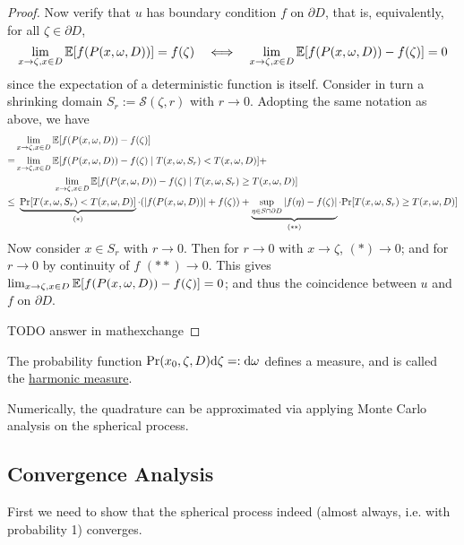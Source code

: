 \documentclass[10pt]{article}
\begin{document}
\begin{proof}
    Now verify that $u$ has boundary condition $f$ on $\partial D$, that is, equivalently, for all $\zeta \in \partial D$,
    \[
        \lim_{x \to \zeta, x \in D} \mathbb{E}[f(P(x, \omega, D))] = f(\zeta)
        \quad \Longleftrightarrow \quad
        \lim_{x \to \zeta, x \in D} \mathbb{E}[f(P(x, \omega, D)) - f(\zeta)] = 0
    \]
    since the expectation of a deterministic function is itself. Consider in turn a shrinking domain $S_r := \mathcal{S}(\zeta, r)$ with $r \to 0$. Adopting the same notation as above, we have
    \begin{align*}
        & \lim_{x \to \zeta, x \in D} \mathbb{E}[f(P(x, \omega, D)) - f(\zeta)] \\
        = & \lim_{x \to \zeta, x \in D} \mathbb{E}[f(P(x, \omega, D)) - f(\zeta) \mid T(x, \omega, S_r) < T(x, \omega, D)] + \\
        & \qquad \qquad \lim_{x \to \zeta, x \in D} \mathbb{E}[f(P(x, \omega, D)) - f(\zeta) \mid T(x, \omega, S_r) \geq T(x, \omega, D)] \\
        \leq &\ \underbrace{\mathrm{Pr}[T(x, \omega, S_r) < T(x, \omega, D)]}_{(\ast)} \cdot (\left|f(P(x, \omega, D))\right| + f(\zeta)) + \underbrace{\sup_{\eta \in S \cap \partial D} \left|f(\eta) - f(\zeta)\right|}_{(\ast\ast)} \cdot \mathrm{Pr}[T(x, \omega, S_r) \geq T(x, \omega, D)]
    \end{align*}
    Now consider $x \in S_r$ with $r \to 0$. Then for $r \to 0$ with $x \to \zeta$, $(\ast) \to 0$; and for $r \to 0$ by continuity of $f$ $(\ast\ast) \to 0$. This gives $\lim_{x \to \zeta, x \in D} \mathbb{E}[f(P(x, \omega, D)) - f(\zeta)] = 0$; and thus the coincidence between $u$ and $f$ on $\partial D$.

    {\color{red} TODO answer in mathexchange}
\end{proof}

\begin{remark}
    The probability function $\mathrm{Pr}(x_0, \zeta, D) \mathrm{d} \zeta =: \mathrm{d} \omega$ defines a measure, and is called the \underline{harmonic measure}.
\end{remark}

\textstart
Numerically, the quadrature can be approximated via applying Monte Carlo analysis on the spherical process.

\subsection{Convergence Analysis}

\textstart
First we need to show that the spherical process indeed (almost always, i.e. with probability 1) converges.
\end{document}
